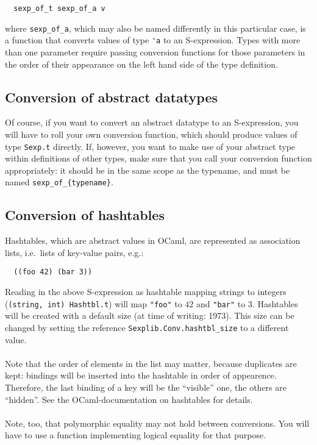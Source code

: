 \documentclass[a4paper]{article}
\begin{document}
\begin{verbatim}
  sexp_of_t sexp_of_a v
\end{verbatim}

\noindent where \verb=sexp_of_a=, which may also be named differently in
this particular case, is a function that converts values of type \verb='a=
to an S-expression.  Types with more than one parameter require passing
conversion functions for those parameters in the order of their appearance
on the left hand side of the type definition.

\subsection{Conversion of abstract datatypes}

Of course, if you want to convert an abstract datatype to an S-expression,
you will have to roll your own conversion function, which should produce
values of type \verb=Sexp.t= directly.  If, however, you want to make
use of your abstract type within definitions of other types, make sure
that you call your conversion function appropriately: it should be in the
same scope as the typename, and must be named \verb=sexp_of_{typename}=.

\subsection{Conversion of hashtables}

Hashtables, which are abstract values in OCaml, are represented as
association lists, i.e.\ lists of key-value pairs, e.g.:

\begin{verbatim}
  ((foo 42) (bar 3))
\end{verbatim}

Reading in the above S-expression as hashtable mapping strings to
integers (\verb=(string, int) Hashtbl.t=) will map \verb="foo"= to $42$
and \verb="bar"= to $3$.  Hashtables will be created with a default size
(at time of writing: 1973).  This size can be changed by setting the
reference \verb=Sexplib.Conv.hashtbl_size= to a different value.\\
\\
Note that the order of elements in the list may matter, because
duplicates are kept: bindings will be inserted into the hashtable in
order of appearence.  Therefore, the last binding of a key will be the
``visible'' one, the others are ``hidden''.  See the OCaml-documentation
on hashtables for details.\\
\\
Note, too, that polymorphic equality may not hold between conversions.
You will have to use a function implementing logical equality for that
purpose.
\end{document}
